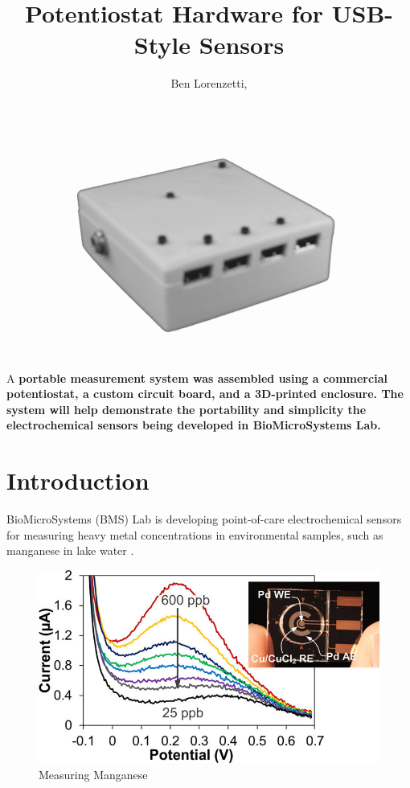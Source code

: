 \documentclass[DIV=calc, paper=letterpaper, fontsize=11pt, twocolumn]{scrartcl}	 %
\title{Potentiostat Hardware for USB-Style Sensors} %
\author{Ben Lorenzetti, } %
\date{} %
\newcommand{\initial}[1]{ %
\lettrine[lines=3,lhang=0.3,nindent=0em]{
\color{DarkGoldenrod}
{\textsf{#1}}}{}}
\begin{document}
\maketitle %

\thispagestyle{fancy} %



\begin{figure}[ht]
\centering
\includegraphics[width=0.6\columnwidth]{complete-assembly}
\end{figure}

\initial{A}\textbf{ portable measurement system was assembled using a commercial potentiostat, a custom circuit board, and a 3D-printed enclosure. The system will help demonstrate the portability and simplicity the electrochemical sensors being developed in BioMicroSystems Lab.}


\section*{Introduction}

BioMicroSystems (BMS) Lab is developing point-of-care electrochemical sensors for measuring heavy metal concentrations in environmental samples,
such as manganese in lake water \cite{bms-article}.

\begin{figure}[ht]
\centering
\includegraphics[width=0.9\columnwidth]{analytical-chemistry-copper-electrode}
\caption{Measuring Manganese \cite{bms-article}}
\end{figure}
\end{document}
